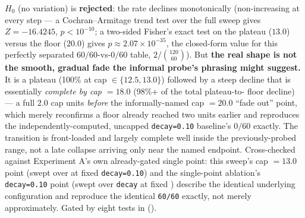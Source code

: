 \documentclass[
  english,
]{article}
\theoremstyle{definition}
\begin{document}
\(H_0\) (no variation) is \textbf{rejected}: the rate declines
monotonically (non-increasing at every step --- a Cochran--Armitage
trend test over the full sweep gives \(Z=-16.4245\), \(p<10^{-10}\); a
two-sided Fisher's exact test on the plateau (\(13.0\)) versus the floor
(\(20.0\)) gives \(p\approx2.07\times10^{-35}\), the closed-form value
for this perfectly separated \(60/60\)-vs-\(0/60\) table,
\(2/\binom{120}{60}\)). But \textbf{the real shape is not the smooth,
gradual fade the informal probe's phrasing might suggest.} It is a
plateau (100\% at cap \(\in\{12.5, 13.0\}\)) followed by a steep decline
that is essentially \emph{complete by cap \(=18.0\)} (98\%+ of the total
plateau-to- floor decline) --- a full \(2.0\) cap units \emph{before}
the informally-named cap \(=20.0\) ``fade out'' point, which merely
reconfirms a floor already reached two units earlier and reproduces the
independently-computed, uncapped \texttt{decay=0.10} baseline's \(0/60\)
exactly. The transition is front-loaded and largely complete well inside
the previously-probed range, not a late collapse arriving only near the
named endpoint. Cross-checked against Experiment A's own already-gated
single point: this sweep's cap \(=13.0\) point (swept over
 at fixed \texttt{decay=0.10}) and
the single-point ablation's \texttt{decay=0.10} point (swept over
\texttt{decay} at fixed )
describe the identical underlying configuration and reproduce the
identical \texttt{60/60} exactly, not merely approximately. Gated by
eight tests in 
().
\end{document}
